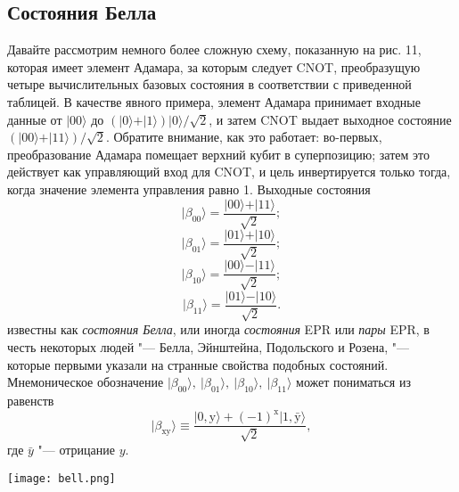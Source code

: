 \begin{multicols}{2}
    \section*{Состояния Белла} 
    \normalsize{
        Давайте рассмотрим немного более сложную схему, показанную на рис. 11, которая имеет
        элемент Адамара, за которым следует CNOT, преобразущую четыре вычислительных базовых состояния
        в соответствии с приведенной таблицей. В качестве явного примера, элемент Адамара принимает входные данные от $\vert00\rangle$ до $(\vert0\rangle+\vert1\rangle)\vert0\rangle/\sqrt2$, и затем CNOT выдает выходное состояние $(\vert00\rangle+\vert11\rangle)/\sqrt2$.
        Обратите внимание, как это работает: во-первых, преобразование Адамара помещает верхний кубит в суперпозицию;
        затем это действует как управляющий вход для CNOT, и цель инвертируется только тогда, когда
        значение элемента управления равно 1. Выходные состояния
        \begin{equation}
            \vert\beta_{00}\rangle=\frac{\vert00\rangle+\vert11\rangle}{\sqrt2};
        \end{equation}
        \begin{equation}
            \vert\beta_{01}\rangle=\frac{\vert01\rangle+\vert10\rangle}{\sqrt2};
        \end{equation}
        \begin{equation}
            \vert\beta_{10}\rangle=\frac{\vert00\rangle-\vert11\rangle}{\sqrt2};
        \end{equation}
        \begin{equation}
            \vert\beta_{11}\rangle=\frac{\vert01\rangle-\vert10\rangle}{\sqrt2}.
        \end{equation}
        известны как \emph{состояния Белла}, или иногда \emph{состояния} EPR или \emph{пары} EPR, в честь некоторых
        людей "--- Белла, Эйнштейна, Подольского и Розена, "--- которые первыми указали на странные
        свойства подобных состояний. Мнемоническое обозначение $\vert\beta_{00}\rangle,~\vert\beta_{01}\rangle,~\vert\beta_{10}\rangle,~\vert\beta_{11}\rangle$ может пониматься из равенств
        \begin{equation}
            \vert\beta_{\text{xy}}\rangle\equiv\frac{\vert0,\text{y}\rangle+(-1)^{\text{x}}\vert1,\bar{\text{y}}\rangle}{\sqrt2},
        \end{equation}
        где $\bar{y}$ "--- отрицание $y$.
    }\\
    \begin{flushleft}
        \begin{minipage}{0.3\textwidth}{\texttt{[image: bell.png]}}
        \end{minipage}\\
        \vspace{0.3cm}
    \end{flushleft}

\end{multicols}
